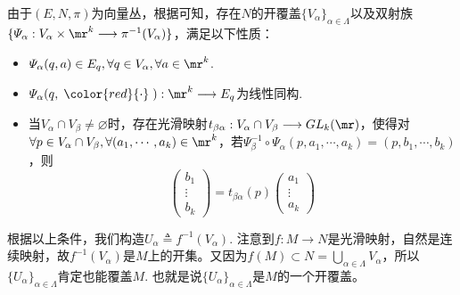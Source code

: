 由于$(E,N,\pi)$为向量丛，根据可知，存在$N$的开覆盖$\{V_{\alpha} \}_{\alpha\in \Lambda}$以及双射族$\{\varPsi_{\alpha}:V_{\alpha}\times \mr^{k}\longrightarrow \pi^{-1}(V_{\alpha}) \}$，满足以下性质：
\begin{itemize}
	\item[(1)] $\varPsi_{\alpha}(q,a)\in E_{q},\forall q\in V_{\alpha},\forall a\in \mr^{k}$.
	\item[(2)] $\varPsi_{\alpha}(q,\;{\color{red}{\cdot}}\;):\mr^{k}\longrightarrow E_{q}$为线性同构.
	\item[(3)] 当$V_{\alpha}\cap V_{\beta}\neq\varnothing$时，存在光滑映射$t_{\beta\alpha}:V_{\alpha}\cap V_{\beta}\longrightarrow GL_{k}(\mr)$，使得对$\forall p\in V_{\alpha}\cap V_{\beta},\forall (a_{1},\cdots,a_{k})\in \mr^{k}$，若$\varPsi_{\beta}^{-1}\circ\varPsi_{\alpha}(p,a_{1},\cdots,a_{k})=(p,b_{1},\cdots,b_{k})$，则
	\[
	\left( \begin{array}{ccc}{b_{1}} \\ {\vdots}  \\ {b_{k}} \end{array}\right)=t_{\beta\alpha}(p) \left( \begin{array}{ccc}{a_{1}} \\ {\vdots}  \\ {a_{k}} \end{array}\right)
	\]
\end{itemize}

根据以上条件，我们构造$U_{\alpha}\triangleq f^{-1} \left( V_{\alpha} \right)$. 注意到$f:M\longrightarrow N$是光滑映射，自然是连续映射，故$f^{-1} \left( V_{\alpha} \right)$是$M$上的开集。又因为$f(M)\subset N=\bigcup_{\alpha\in \Lambda}V_{\alpha}$，所以$\{U_{\alpha}\}_{\alpha\in \Lambda}$肯定也能覆盖$M$. 也就是说$\{U_{\alpha}\}_{\alpha\in \Lambda}$是$M$的一个开覆盖。

